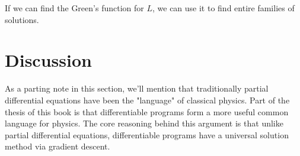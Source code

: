 \documentclass[book.tex]{subfiles}
\begin{document}
If we can find the Green's function for $L$, we can use it to find entire families of solutions. 

\section{Discussion}


As a parting note in this section, we'll mention that traditionally partial differential equations have been the "language" of classical physics. Part of the thesis of this book is that differentiable programs form a more useful common language for physics. The core reasoning behind this argument is that unlike partial differential equations, differentiable programs have a universal solution method via gradient descent.


\end{document}
